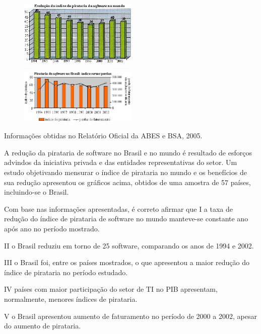 \documentclass{exam}
\begin{document}
\begin{questions}
\begin{figure}[H]
	\begin{center}
		\includegraphics[width=0.5\textwidth]{CIENCIA_DA_COMPUTACAO_Prova2005-utf8_figuras/fig-0031.jpg}
	\end{center}
\end{figure}

\begin{figure}[H]
	\begin{center}
		\includegraphics[width=0.5\textwidth]{CIENCIA_DA_COMPUTACAO_Prova2005-utf8_figuras/fig-0032.jpg}
	\end{center}
\end{figure}
Informações obtidas no Relatório Oficial da ABES e BSA, 2005.

A redução da pirataria de software no Brasil e no mundo
é resultado de esforços advindos da iniciativa privada e das
entidades representativas do setor. Um estudo objetivando
mensurar o índice de pirataria no mundo e os benefícios de sua
redução apresentou os gráficos acima, obtidos de uma amostra
de 57 países, incluindo-se o Brasil.

Com base nas informações apresentadas, é correto afirmar que
I a taxa de redução do índice de pirataria de software no mundo
manteve-se constante ano após ano no período mostrado.

II o Brasil reduziu em torno de 25%
software, comparando os anos de 1994 e 2002.

III o Brasil foi, entre os países mostrados, o que apresentou a maior
redução do índice de pirataria no período estudado.

IV países com maior participação do setor de TI no PIB apresentam,
normalmente, menores índices de pirataria.

V o Brasil apresentou aumento de faturamento no período de 2000
a 2002, apesar do aumento de pirataria.


\end{questions}
\end{document}
